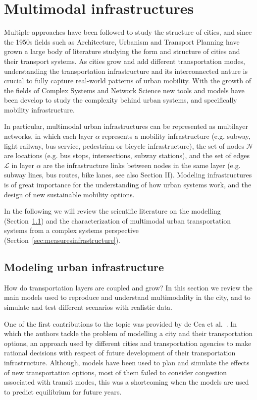 \section{Multimodal infrastructures}\label{sec:multimodalinfrastructures}

Multiple approaches have been followed to study the structure of cities, and since the 1950s fields such as Architecture, Urbanism and Transport Planning have grown a large body of literature studying the form and structure of cities and their transport systems. As cities grow and add different transportation modes, understanding the transportation infrastructure and its interconnected nature is crucial to fully capture real-world patterns of urban mobility. With the growth of the fields of Complex Systems and Network Science new tools and models have been develop to study the complexity behind urban systems, and specifically mobility infrastructure.

In particular, multimodal urban infrastructures can be represented as multilayer networks, in which each layer $\alpha$ represents a mobility infrastructure (e.g. subway, light railway, bus service, pedestrian or bicycle infrastructure), the set of nodes $\mathcal{N}$ are locations (e.g. bus stops, intersections, subway stations), and the set of edges $\mathcal{L}$ in layer $\alpha$ are the infrastructure links between nodes in the same layer (e.g. subway lines, bus routes, bike lanes, see also Section II).
Modeling infrastructures is of great importance for the understanding of how urban systems work, and the design of new sustainable mobility options. 

In the following we will review the scientific literature on the modelling (Section~\ref{sec:modelinginsrastructure}) and the characterization of multimodal urban transportation systems from a complex systems perspective (Section~\ref{sec:measuresinfrastructure}).


\subsection{Modeling urban infrastructure}\label{sec:modelinginsrastructure}

How do transportation layers are coupled and grow?
In this section we review the main models used to reproduce and understand multimodality in the city, and to simulate and test different scenarios with realistic data. 

One of the first contributions to the topic was provided by de Cea et al.~\cite{decea2005equilibrium}. In which the authors tackle the problem of modelling a city and their transportation options, an approach used by different cities and transportation agencies to make rational decisions with respect of future development of their transportation infrastructure. Although, models have been used to plan and simulate the effects of new transportation options, most of them failed to consider congestion associated with transit modes, this was a shortcoming when the models are used to predict equilibrium for future years. 

